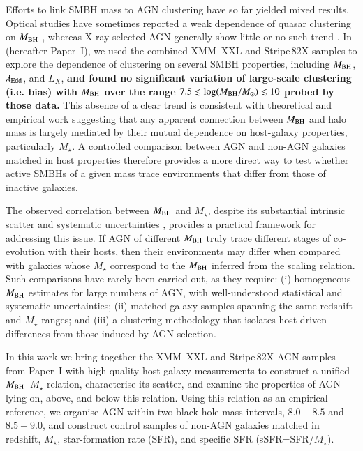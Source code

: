 \documentclass{aa}
\begin{document}
Efforts to link SMBH mass to AGN clustering have so far yielded mixed results. Optical studies have sometimes reported a weak dependence of quasar clustering on $M_{\rm BH}$ \citep[e.g.][]{Shen2009}, whereas X-ray-selected AGN generally show little or no such trend \citep[e.g.][]{Krumpe2015, Krumpe2023}. In \citet{Mountrichas2026b} (hereafter Paper~I), we used the combined XMM–XXL and Stripe\,82X samples to explore the dependence of clustering on several SMBH properties, including $M_{\rm BH}$, $\lambda_{\rm Edd}$, and $L_X$, \textbf{and found no significant variation of large-scale clustering (i.e. bias) with $M_{\rm BH}$ over the range $7.5 \lesssim \log(M_{\rm BH}/M_\odot) \lesssim 10$ probed by those data.} This absence of a clear trend is consistent with theoretical and empirical work suggesting that any apparent connection between $M_{\rm BH}$ and halo mass is largely mediated by their mutual dependence on host-galaxy properties, particularly $M_\star$. A controlled comparison between AGN and non-AGN galaxies matched in host properties therefore provides a more direct way to test whether active SMBHs of a given mass trace environments that differ from those of inactive galaxies.

The observed correlation between $M_{\rm BH}$ and $M_{\star}$, despite its substantial intrinsic scatter and systematic uncertainties \citep[e.g.][]{Shankar2016}, provides a practical framework for addressing this issue. If AGN of different $M_{\rm BH}$ truly trace different stages of co-evolution with their hosts, then their environments may differ when compared with galaxies whose $M_\star$ correspond to the $M_{\rm BH}$ inferred from the scaling relation. Such comparisons have rarely been carried out, as they require: (i) homogeneous $M_{\rm BH}$ estimates for large numbers of AGN, with well-understood statistical and systematic uncertainties; (ii) matched galaxy samples spanning the same redshift and $M_\star$ ranges; and (iii) a clustering methodology that isolates host-driven differences from those induced by AGN selection.

In this work we bring together the XMM--XXL and Stripe\,82X AGN samples from Paper~I with high-quality host-galaxy measurements to construct a unified $M_{\rm BH}$--$M_{\star}$ relation, characterise its scatter, and examine the properties of AGN lying on, above, and below this relation. Using this relation as an empirical reference, we organise AGN within two black-hole mass intervals, $8.0\!-\!8.5$ and $8.5\!-\!9.0$, and construct control samples of non-AGN galaxies matched in redshift, $M_\star$, star-formation rate (SFR), and specific SFR (sSFR=SFR$/M_\star$).
\end{document}

